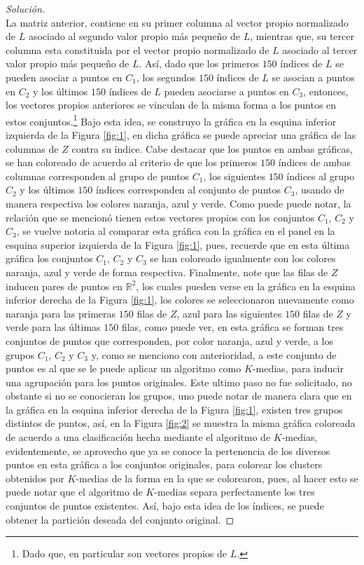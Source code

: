 \documentclass[10.5pt,notitlepage]{article}
\newenvironment{solucion}
  {\begin{proof}[Solución]}
  {\end{proof}}
\newcommand{\RR}{\mathbb{R}}
\theoremstyle{plain}
\begin{document}
\begin{solucion}
\[{}
\]
La matriz anterior, contiene en su primer columna al vector propio normalizado de \(L\) asociado al segundo valor propio más pequeño de \(L\), mientras que, su tercer columna esta constituida por el vector propio normalizado de \(L\) asociado al tercer valor propio más pequeño de \(L\). Así, dado que los primeros \(150\) índices de \(L\) se pueden asociar a puntos en \(C_{1}\), los segundos \(150\) índices de \(L\) se asocian a puntos en \(C_{2}\) y los últimos \(150\) índices de \(L\) pueden asociarse a puntos en \(C_3\), entonces, los vectores propios anteriores se vinculan de la misma forma a los puntos en estos conjuntos.\footnote{Dado que, en particular son vectores propios de \(L\).} Bajo esta idea, se construyo la gráfica en la esquina inferior izquierda de la Figura \ref{fig:1}, en dicha gráfica se puede apreciar una gráfica de las columnas de \(Z\) contra su índice. Cabe destacar que los puntos en ambas gráficas, se han coloreado de acuerdo al criterio de que los primeros \(150\) índices de ambas columnas corresponden al grupo de puntos \(C_1\), los siguientes \(150\) índices al grupo \(C_2\) y los últimos \(150\) índices corresponden al conjunto de puntos \(C_3\), usando de manera respectiva los colores naranja, azul y verde. Como puede puede notar, la relación que se mencionó tienen estos vectores propios con los conjuntos \(C_1\), \(C_2\) y \(C_3\), se vuelve notoria al comparar esta gráfica con la gráfica en el panel en la esquina superior izquierda de la Figura \ref{fig:1}, pues, recuerde que en esta última gráfica los conjuntos \(C_1\), \(C_2\) y \(C_3\) se han coloreado igualmente con los colores naranja, azul y verde de forma respectiva. Finalmente, note que las filas de \(Z\) inducen pares de puntos en \(\RR^2\), los cuales pueden verse en la gráfica en la esquina inferior derecha de la Figura \ref{fig:1}, los colores se seleccionaron nuevamente como naranja para las primeras \(150\) filas de \(Z\), azul para las siguientes \(150\) filas de \(Z\) y verde para las últimas \(150\) filas, como puede ver, en esta gráfica se forman tres conjuntos de puntos que corresponden, por color naranja, azul y verde, a los grupos \(C_1\), \(C_2\) y \(C_3\) y, como se menciono con anterioridad, a este conjunto de puntos es al que se le puede aplicar un algoritmo como \(K\)-medias, para inducir una agrupación para los puntos originales. Este ultimo paso no fue solicitado, no obstante si no se conocieran los grupos, uno puede notar de manera clara que en la gráfica en la esquina inferior derecha de la Figura \ref{fig:1}, existen tres grupos distintos de puntos, así, en la Figura \ref{fig:2} se muestra la misma gráfica coloreada de acuerdo a una clasificación hecha mediante el algoritmo de \(K\)-medias, evidentemente, se aprovecho que ya se conoce la pertenencia de los diversos puntos en esta gráfica a los conjuntos originales, para colorear los clusters obtenidos por \(K\)-medias de la forma en la que se colorearon, pues, al hacer esto se puede notar que el algoritmo de \(K\)-medias separa perfectamente los tres conjuntos de puntos existentes. Así, bajo esta idea de los índices, se puede obtener la partición deseada del conjunto original.   

\end{solucion}
\end{document}
